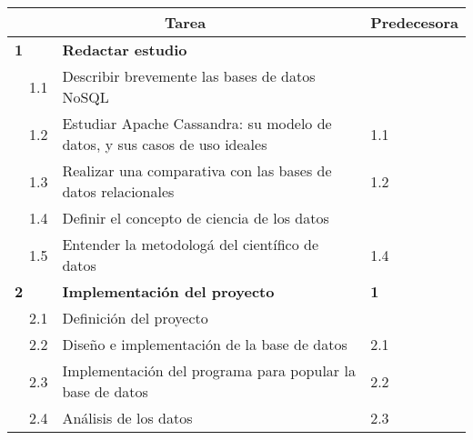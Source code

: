 \begin{table}[!htb]
\centering
\begin{tabular}{l|l|l|l|l|l|}
\hline
\multicolumn{5}{|c|}{Tarea}                                                                                                       & Predecesora \\ \hline
\multicolumn{2}{|l|}{\textbf{1}} & \multicolumn{3}{l|}{\textbf{Redactar  estudio}}                                                &             \\ \hline
              & 1.1              & \multicolumn{3}{l|}{Describir brevemente las bases de datos NoSQL}                             &             \\ \cline{2-6} 
              & 1.2              & \multicolumn{3}{l|}{Estudiar Apache Cassandra: su modelo de datos, y sus casos de uso ideales} & 1.1         \\ \cline{2-6} 
              & 1.3              & \multicolumn{3}{l|}{Realizar una comparativa con las bases de datos relacionales}              & 1.2         \\ \cline{2-6} 
              & 1.4              & \multicolumn{3}{l|}{Definir el concepto de ciencia de los datos}                               &             \\ \cline{2-6} 
              & 1.5              & \multicolumn{3}{l|}{Entender la metodologá del científico de datos}                            & 1.4         \\ \hline
\multicolumn{2}{|l|}{\textbf{2}} & \multicolumn{3}{l|}{\textbf{Implementación del proyecto}}                                      & \textbf{1}  \\ \hline
              & 2.1              & \multicolumn{3}{l|}{Definición del proyecto}                                                   &             \\ \cline{2-6} 
              & 2.2              & \multicolumn{3}{l|}{Diseño e implementación de la base de datos}                               & 2.1         \\ \cline{2-6} 
              & 2.3              & \multicolumn{3}{l|}{Implementación del programa para popular la base de datos}                 & 2.2         \\ \cline{2-6} 
              & 2.4              & \multicolumn{3}{l|}{Análisis de los datos}                                                     & 2.3         \\ \cline{2-6} 
\end{tabular}
\end{table}

